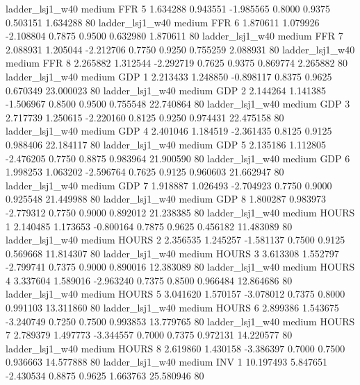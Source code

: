        ladder_lsj1_w40     medium      FFR                 5  1.634288 0.943551 -1.985565 0.8000 0.9375  0.503151    1.634288 80
       ladder_lsj1_w40     medium      FFR                 6  1.870611 1.079926 -2.108804 0.7875 0.9500  0.632980    1.870611 80
       ladder_lsj1_w40     medium      FFR                 7  2.088931 1.205044 -2.212706 0.7750 0.9250  0.755259    2.088931 80
       ladder_lsj1_w40     medium      FFR                 8  2.265882 1.312544 -2.292719 0.7625 0.9375  0.869774    2.265882 80
       ladder_lsj1_w40     medium      GDP                 1  2.213433 1.248850 -0.898117 0.8375 0.9625  0.670349   23.000023 80
       ladder_lsj1_w40     medium      GDP                 2  2.144264 1.141385 -1.506967 0.8500 0.9500  0.755548   22.740864 80
       ladder_lsj1_w40     medium      GDP                 3  2.717739 1.250615 -2.220160 0.8125 0.9250  0.974431   22.475158 80
       ladder_lsj1_w40     medium      GDP                 4  2.401046 1.184519 -2.361435 0.8125 0.9125  0.988406   22.184117 80
       ladder_lsj1_w40     medium      GDP                 5  2.135186 1.112805 -2.476205 0.7750 0.8875  0.983964   21.900590 80
       ladder_lsj1_w40     medium      GDP                 6  1.998253 1.063202 -2.596764 0.7625 0.9125  0.960603   21.662947 80
       ladder_lsj1_w40     medium      GDP                 7  1.918887 1.026493 -2.704923 0.7750 0.9000  0.925548   21.449988 80
       ladder_lsj1_w40     medium      GDP                 8  1.800287 0.983973 -2.779312 0.7750 0.9000  0.892012   21.238385 80
       ladder_lsj1_w40     medium    HOURS                 1  2.140485 1.173653 -0.800164 0.7875 0.9625  0.456182   11.483089 80
       ladder_lsj1_w40     medium    HOURS                 2  2.356535 1.245257 -1.581137 0.7500 0.9125  0.569668   11.814307 80
       ladder_lsj1_w40     medium    HOURS                 3  3.613308 1.552797 -2.799741 0.7375 0.9000  0.890016   12.383089 80
       ladder_lsj1_w40     medium    HOURS                 4  3.337604 1.589016 -2.963240 0.7375 0.8500  0.966484   12.864686 80
       ladder_lsj1_w40     medium    HOURS                 5  3.041620 1.570157 -3.078012 0.7375 0.8000  0.991103   13.311860 80
       ladder_lsj1_w40     medium    HOURS                 6  2.899386 1.543675 -3.240749 0.7250 0.7500  0.993853   13.779765 80
       ladder_lsj1_w40     medium    HOURS                 7  2.789379 1.497773 -3.344557 0.7000 0.7375  0.972131   14.220577 80
       ladder_lsj1_w40     medium    HOURS                 8  2.619860 1.430158 -3.386397 0.7000 0.7500  0.936663   14.577888 80
       ladder_lsj1_w40     medium      INV                 1 10.197493 5.847651 -2.430534 0.8875 0.9625  1.663763   25.580946 80
